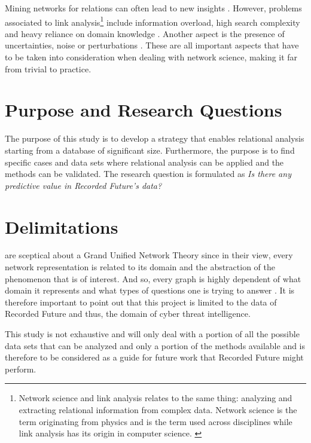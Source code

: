 Mining networks for relations can often lead to new insights \cite{hendrix2010}. However, problems associated to link analysis\footnote{Network science and link analysis relates to the same thing: analyzing and extracting relational information from complex data. Network science is the term originating from physics and is the term used across disciplines while link analysis has its origin in computer science. \cite{fouss2016algorithms}} include information overload, high search complexity and heavy reliance on domain knowledge \cite{hendrix2010,schroeder2007}. Another aspect is the presence of uncertainties, noise or perturbations \cite{hendrix2010}. These are all important aspects that have to be taken into consideration when dealing with network science, making it far from trivial to practice. 

\section{Purpose and Research Questions}

The purpose of this study is to develop a strategy that enables relational analysis starting from a database of significant size. Furthermore, the purpose is to find specific cases and data sets where relational analysis can be applied and the methods can be validated. The research question is formulated as \textit{Is there any predictive value in Recorded Future's data?} 

\begin{comment}
The purpose of this study is to investigate the possibility to transform a database into a relational based graph database in order to reveal new relations and draw more conclusions about the existing data. The purpose can be broken down into the following three research questions:
\begin{enumerate}
	\item Are there classes or specific types of relations that are of special significance for cyber threat analysis?
    \item What kind of network analysis and statistics is important when performing cyber threat analysis?
    \item What methodology and design is suitable for extracting hidden relations in a big database within reasonable execution time?
\end{enumerate}
\end{comment}

\section{Delimitations}
\citet{brandes2013} are sceptical about a Grand Unified Network Theory since in their view, every network representation is related to its domain and the abstraction of the phenomenon that is of interest. And so, every graph is highly dependent of what domain it represents and what types of questions one is trying to answer \cite{hendrix2010, schroeder2007}. It is therefore important to point out that this project is limited to the data of Recorded Future and thus, the domain of cyber threat intelligence. 

This study is not exhaustive and will only deal with a portion of all the possible data sets that can be analyzed and only a portion of the methods available and is therefore to be considered as a guide for future work that Recorded Future might perform.
